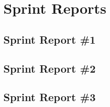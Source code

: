 
\chapter{Sprint Reports}

\section{Sprint Report \#1}

\section{Sprint Report \#2}

\section{Sprint Report \#3}
